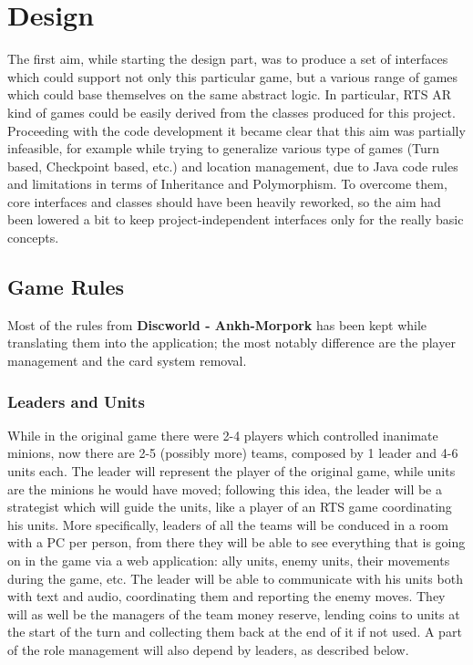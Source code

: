 \chapter{Design}

	The first aim, while starting the design part, was to produce a set of interfaces which could support not only this particular game, but a various range of games which could base themselves on the same abstract logic.
	In particular, RTS AR kind of games could be easily derived from the classes produced for this project.
	Proceeding with the code development it became clear that this aim was partially infeasible, for example while trying to generalize various type of games (Turn based, Checkpoint based, etc.) and location management, due to Java code rules and limitations in terms of Inheritance and Polymorphism.
	To overcome them, core interfaces and classes should have been heavily reworked, so the aim had been lowered a bit to keep project-independent interfaces only for the really basic concepts.

	\section{Game Rules}
		
		Most of the rules from \textbf{Discworld - Ankh-Morpork} has been kept while translating them into the application; the most notably difference are the player management and the card system removal.
		
		\subsection{Leaders and Units}
		
			While in the original game there were 2-4 players which controlled inanimate minions, now there are 2-5 (possibly more) teams, composed by 1 leader and 4-6 units each.
			The leader will represent the player of the original game, while units are the minions he would have moved; following this idea, the leader will be a strategist which will guide the units, like a player of an RTS game coordinating his units.
			More specifically, leaders of all the teams will be conduced in a room with a PC per person, from there they will be able to see everything that is going on in the game via a web application: ally units, enemy units, their movements during the game, etc.
			The leader will be able to communicate with his units both with text and audio, coordinating them and reporting the enemy moves.
			They will as well be the managers of the team money reserve, lending coins to units at the start of the turn and collecting them back at the end of it if not used.
			A part of the role management will also depend by leaders, as described below.
		
